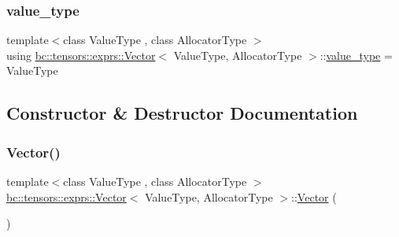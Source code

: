 \subsubsection{\texorpdfstring{value\+\_\+type}{value\_type}}
{\footnotesize\ttfamily template$<$class Value\+Type , class Allocator\+Type $>$ \\
using \hyperlink{structbc_1_1tensors_1_1exprs_1_1Vector}{bc\+::tensors\+::exprs\+::\+Vector}$<$ Value\+Type, Allocator\+Type $>$\+::\hyperlink{structbc_1_1tensors_1_1exprs_1_1Vector_a61ba759af8b26329103ce2b0765dade5}{value\+\_\+type} =  Value\+Type}



\subsection{Constructor \& Destructor Documentation}
\mbox{\label{structbc_1_1tensors_1_1exprs_1_1Vector_ad7a2aba8225a81c05e95c2db13e2e939}} 
\subsubsection{\texorpdfstring{Vector()}{Vector()}\hspace{0.1cm}{\footnotesize\ttfamily [1/5]}}
{\footnotesize\ttfamily template$<$class Value\+Type , class Allocator\+Type $>$ \\
\hyperlink{structbc_1_1tensors_1_1exprs_1_1Vector}{bc\+::tensors\+::exprs\+::\+Vector}$<$ Value\+Type, Allocator\+Type $>$\+::\hyperlink{structbc_1_1tensors_1_1exprs_1_1Vector}{Vector} (\begin{DoxyParamCaption}{ }\end{DoxyParamCaption})\hspace{0.3cm}{\ttfamily [default]}}

\mbox{\label{structbc_1_1tensors_1_1exprs_1_1Vector_ab46a08ed533ac62c54e2249d373a4b4d}} 
